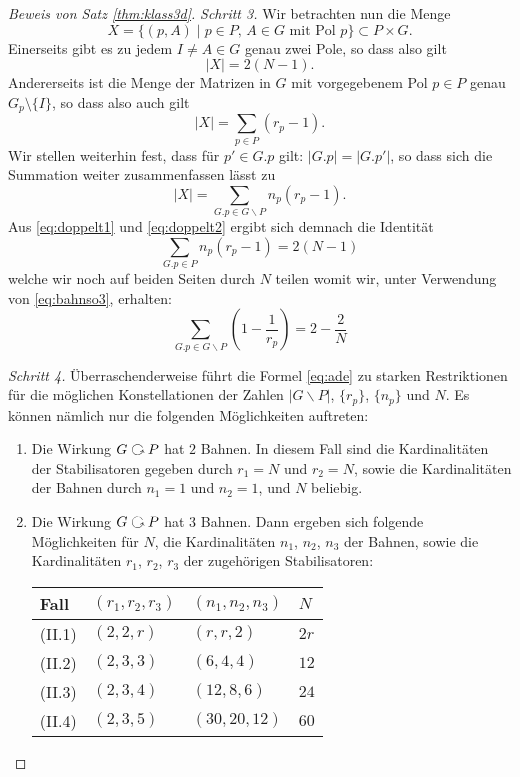 \documentclass{book}
\begin{document}
\begin{proof}[Beweis von Satz \ref{thm:klass3d}]
    \noindent
    \emph{Schritt 3.} Wir betrachten nun die Menge
    \[
        X = \{ (p,A)\; | \; \text{$p \in P$, $A \in G$ mit Pol $p$} \} \subset P \times G.
    \]
    Einerseits gibt es zu jedem $I \neq A \in G$ genau zwei Pole, so dass also gilt
    \begin{equation}
        \label{eq:doppelt1}
        | X | = 2 (N-1).
    \end{equation}
    Andererseits ist die Menge der Matrizen in $G$ mit vorgegebenem Pol $p \in
    P$ genau $G_p \setminus \{I\}$, so dass also auch gilt
    \[
         |X| = \sum_{p \in P} (r_p - 1).
     \]
    Wir stellen weiterhin fest, dass für $p' \in G.p$ gilt: $|G.p| = |G.p'|$,
    so dass sich die Summation weiter zusammenfassen lässt zu 
    \begin{equation}
        \label{eq:doppelt2}
         |X| = \sum_{G.p \in G \backslash P} n_p(r_p - 1).
    \end{equation}
    Aus \eqref{eq:doppelt1} und \eqref{eq:doppelt2} ergibt sich demnach die Identität
    \[
        \sum_{G.p \in P} n_p(r_p - 1) = 2 (N-1)
    \]
    welche wir noch auf beiden Seiten durch $N$ teilen womit wir, unter Verwendung von \eqref{eq:bahnso3}, erhalten:
    \begin{equation}
        \label{eq:ade}
        \sum_{G.p \in G \backslash P} (1 - \frac{1}{r_p} ) = 2 - \frac{2}{N} 
    \end{equation}


    \noindent
    \emph{Schritt 4.} Überraschenderweise führt die Formel \eqref{eq:ade} zu
    starken Restriktionen für die möglichen Konstellationen der Zahlen $|G
    \backslash P|$, $\{r_p\}$, $\{n_p\}$ und $N$. Es können nämlich nur die folgenden Möglichkeiten auftreten:
    \begin{enumerate}[label=(\Roman *)]
        \item\label{so3:I} Die Wirkung $G \actson P$ hat $2$ Bahnen. In diesem Fall sind die
            Kardinalitäten der Stabilisatoren gegeben durch $r_1 = N$ und $r_2 = N$, sowie die
            Kardinalitäten der Bahnen durch $n_1 = 1$ und $n_2 = 1$, und $N$ beliebig. 
        \item\label{so3:II} Die Wirkung $G \actson P$ hat $3$ Bahnen. Dann ergeben sich 
            folgende Möglichkeiten für $N$, die Kardinalitäten $n_1$,
            $n_2$, $n_3$ der Bahnen, sowie die Kardinalitäten $r_1$, $r_2$, $r_3$ der
            zugehörigen Stabilisatoren:
            \begin{center}
            \begin{tabular}{l|l|l|l}
                Fall & $(r_1,r_2,r_3)$ & $(n_1,n_2,n_3)$ & $N$\\ \hline
                (II.1) & $(2,2,r )$ & $(r,r, 2)$ & $2r$\\
                (II.2) &  $(2,3,3)$ & $(6,4,4)$ & $12$\\
                (II.3) & $(2,3,4)$ & $(12,8,6)$ & $24$\\
                (II.4) & $(2,3,5)$ & $(30,20,12)$ & $60$
            \end{tabular}
        \end{center}
    \end{enumerate}


\end{proof}
\end{document}
